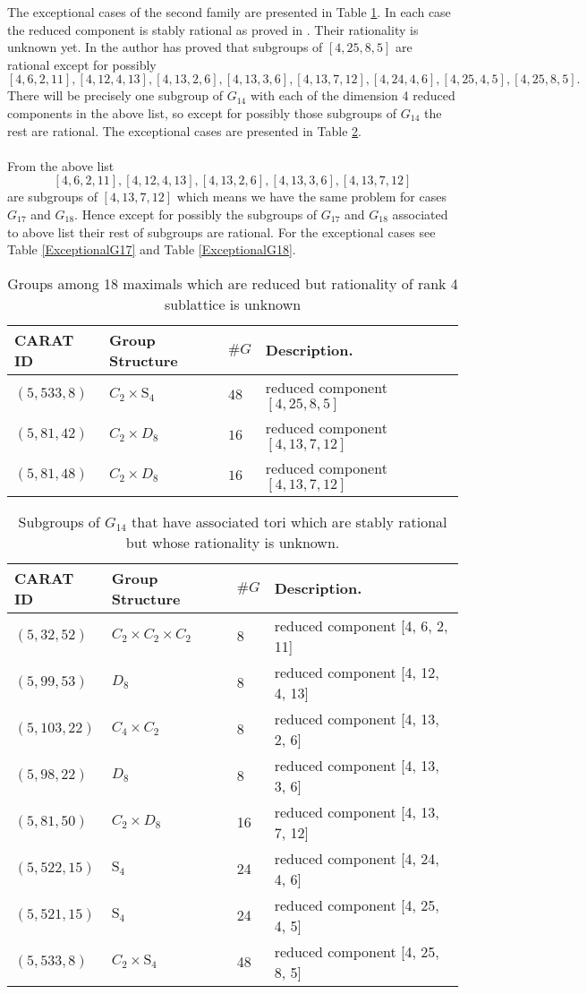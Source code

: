 \documentclass[a4paper, 14pt]{extarticle}
\theoremstyle{plain}
\theoremstyle{definition}
\begin{document}
\noindent
The exceptional cases of the second family are presented in Table \ref{Tbl:RationalityUnknown}. In each case the reduced component is stably rational as proved in \cite{Hoshi}. Their rationality is unknown yet. In \cite{Nicole1} the author has proved that subgroups of $[ 4, 25, 8, 5 ]$ are rational except for possibly $$[4, 6, 2, 11], [4, 12, 4, 13], [4, 13, 2, 6], [4, 13, 3, 6], [4, 13, 7, 12], [4, 24, 4, 6], [4, 25, 4, 5], [4, 25, 8, 5].$$
There will be precisely one subgroup of $G_{14}$ with each of the dimension 4 reduced components in the above list, so except for possibly those subgroups of $G_{14}$ the rest are rational. The exceptional cases are presented in Table \ref{ExceptionalG14}.\\
\\
From the above list $$[4, 6, 2, 11], [4, 12, 4, 13], [4, 13, 2, 6], [4, 13, 3, 6], [4, 13, 7, 12]$$ are subgroups of $[4, 13, 7, 12]$ which means we have the same problem for cases $G_{17}$ and $G_{18}$. Hence except for possibly the subgroups of $G_{17}$ and $G_{18}$ associated to above list their rest of subgroups are rational. For the exceptional cases see Table \ref{ExceptionalG17} and Table \ref{ExceptionalG18}.
 \begin{table}[H] 
\centering
\begin{tabular}{lllll}
CARAT ID & Group Structure & $\#G$ & Description.\\\hline
 $(5,533,8)$ & $C_2\times \mathrm{S}_4$ & $48$  & reduced component $[ 4, 25, 8, 5 ]$ &\\
 $(5,81,42)$ & $C_2\times D_8$ & $16$  & reduced component $[ 4, 13, 7, 12 ]$&\\
 $(5,81,48)$ & $C_2\times D_8$ & $16$  & reduced component $[ 4, 13, 7, 12 ]$ &
\end{tabular}
\caption{Groups among 18 maximals which are reduced but rationality of rank 4 sublattice is unknown}
\label{Tbl:RationalityUnknown} 
\end{table}
\begin{table}[H]
\centering
\begin{tabular}{llll}
CARAT ID & Group Structure & $\#G$ & Description.\\\hline
$( 5, 32, 52)$ &	$C_2 \times C_2 \times C_2$& 8 &reduced component 	[4, 6, 2, 11]\\
$( 5, 99, 53 )$ &	$D_8$ & 8&	reduced component [4, 12, 4, 13]\\
$( 5, 103, 22 )$ & $C_4 \times C_2$& 8 &reduced component [4, 13, 2, 6]\\
$( 5, 98, 22 )$& 	$D_8$ & 8&	reduced component [4, 13, 3, 6]\\
$( 5, 81, 50 )$ &		$C_2 \times D_8$ & 16& reduced component [4, 13, 7, 12]\\
$( 5, 522, 15)$ &	$\mathrm{S}_4$& 24&	reduced component 	[4, 24, 4, 6]\\
$( 5, 521, 15 )$ &		$\mathrm{S}_4$ &24&		reduced component [4, 25, 4, 5]\\
$( 5, 533, 8 )$&		$C_2 \times	 \mathrm{S}_4$ & 48&		reduced component [4, 25, 8, 5]
\end{tabular}
\caption{Subgroups of $G_{14}$ that have associated tori which are stably rational but whose rationality is unknown.}
\label{ExceptionalG14}
\end{table}
\end{document}
